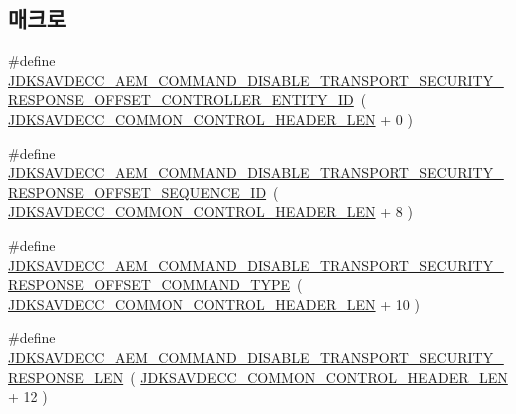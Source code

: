 \subsection*{매크로}
\begin{DoxyCompactItemize}
\item 
\#define \hyperlink{group__command__disable__transport__security__response_ga391b50afd31f3be7b1b70983a66ba6e5}{J\+D\+K\+S\+A\+V\+D\+E\+C\+C\+\_\+\+A\+E\+M\+\_\+\+C\+O\+M\+M\+A\+N\+D\+\_\+\+D\+I\+S\+A\+B\+L\+E\+\_\+\+T\+R\+A\+N\+S\+P\+O\+R\+T\+\_\+\+S\+E\+C\+U\+R\+I\+T\+Y\+\_\+\+R\+E\+S\+P\+O\+N\+S\+E\+\_\+\+O\+F\+F\+S\+E\+T\+\_\+\+C\+O\+N\+T\+R\+O\+L\+L\+E\+R\+\_\+\+E\+N\+T\+I\+T\+Y\+\_\+\+ID}~( \hyperlink{group__jdksavdecc__avtp__common__control__header_gaae84052886fb1bb42f3bc5f85b741dff}{J\+D\+K\+S\+A\+V\+D\+E\+C\+C\+\_\+\+C\+O\+M\+M\+O\+N\+\_\+\+C\+O\+N\+T\+R\+O\+L\+\_\+\+H\+E\+A\+D\+E\+R\+\_\+\+L\+EN} + 0 )
\item 
\#define \hyperlink{group__command__disable__transport__security__response_ga3e93bcccdc12dfb34d7b8bcc1cf31e63}{J\+D\+K\+S\+A\+V\+D\+E\+C\+C\+\_\+\+A\+E\+M\+\_\+\+C\+O\+M\+M\+A\+N\+D\+\_\+\+D\+I\+S\+A\+B\+L\+E\+\_\+\+T\+R\+A\+N\+S\+P\+O\+R\+T\+\_\+\+S\+E\+C\+U\+R\+I\+T\+Y\+\_\+\+R\+E\+S\+P\+O\+N\+S\+E\+\_\+\+O\+F\+F\+S\+E\+T\+\_\+\+S\+E\+Q\+U\+E\+N\+C\+E\+\_\+\+ID}~( \hyperlink{group__jdksavdecc__avtp__common__control__header_gaae84052886fb1bb42f3bc5f85b741dff}{J\+D\+K\+S\+A\+V\+D\+E\+C\+C\+\_\+\+C\+O\+M\+M\+O\+N\+\_\+\+C\+O\+N\+T\+R\+O\+L\+\_\+\+H\+E\+A\+D\+E\+R\+\_\+\+L\+EN} + 8 )
\item 
\#define \hyperlink{group__command__disable__transport__security__response_ga5ad83b5c1d2c2f0abfb991c855588868}{J\+D\+K\+S\+A\+V\+D\+E\+C\+C\+\_\+\+A\+E\+M\+\_\+\+C\+O\+M\+M\+A\+N\+D\+\_\+\+D\+I\+S\+A\+B\+L\+E\+\_\+\+T\+R\+A\+N\+S\+P\+O\+R\+T\+\_\+\+S\+E\+C\+U\+R\+I\+T\+Y\+\_\+\+R\+E\+S\+P\+O\+N\+S\+E\+\_\+\+O\+F\+F\+S\+E\+T\+\_\+\+C\+O\+M\+M\+A\+N\+D\+\_\+\+T\+Y\+PE}~( \hyperlink{group__jdksavdecc__avtp__common__control__header_gaae84052886fb1bb42f3bc5f85b741dff}{J\+D\+K\+S\+A\+V\+D\+E\+C\+C\+\_\+\+C\+O\+M\+M\+O\+N\+\_\+\+C\+O\+N\+T\+R\+O\+L\+\_\+\+H\+E\+A\+D\+E\+R\+\_\+\+L\+EN} + 10 )
\item 
\#define \hyperlink{group__command__disable__transport__security__response_gaa2a1ce5fdb725aaac5f7a4c2892aa70a}{J\+D\+K\+S\+A\+V\+D\+E\+C\+C\+\_\+\+A\+E\+M\+\_\+\+C\+O\+M\+M\+A\+N\+D\+\_\+\+D\+I\+S\+A\+B\+L\+E\+\_\+\+T\+R\+A\+N\+S\+P\+O\+R\+T\+\_\+\+S\+E\+C\+U\+R\+I\+T\+Y\+\_\+\+R\+E\+S\+P\+O\+N\+S\+E\+\_\+\+L\+EN}~( \hyperlink{group__jdksavdecc__avtp__common__control__header_gaae84052886fb1bb42f3bc5f85b741dff}{J\+D\+K\+S\+A\+V\+D\+E\+C\+C\+\_\+\+C\+O\+M\+M\+O\+N\+\_\+\+C\+O\+N\+T\+R\+O\+L\+\_\+\+H\+E\+A\+D\+E\+R\+\_\+\+L\+EN} + 12 )
\end{DoxyCompactItemize}
